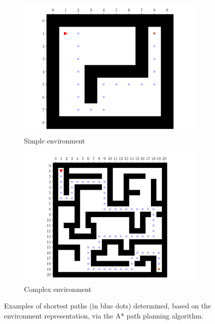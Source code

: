 \begin{figure}[H]
    \centering
    \begin{subfigure}[b]{0.50\textwidth}
        \centering
        \includegraphics[width=\textwidth]{resources/pdf/05/simple-environment/path.pdf}
        \caption{Simple environment}
        \label{fig:05.path.planning.examples.simple}
    \end{subfigure}
    \hfill
    \begin{subfigure}[b]{0.46\textwidth}
        \centering
        \includegraphics[width=\textwidth]{resources/pdf/05/complex-environment/path.pdf}
        \caption{Complex environment}
        \label{fig:05.path.planning.examples.complex}
    \end{subfigure}
    \caption{Examples of shortest paths (in blue dots) determined, based on the environment representation, via the A* path planning algorithm.}
    \label{fig:05.path.planning.examples}
\end{figure}

